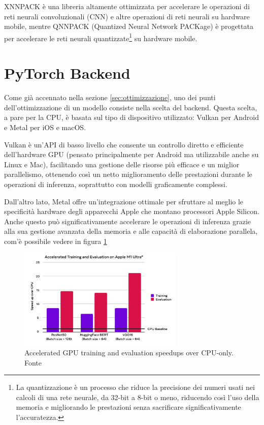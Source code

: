 XNNPACK\cite{XNNPACK} è una libreria altamente ottimizzata per accelerare le operazioni di reti neurali convoluzionali (CNN) e altre operazioni di reti neurali su hardware mobile,
mentre QNNPACK\cite{QNNPACK} (Quantized Neural Network PACKage) è progettata per accelerare le reti neurali quantizzate\footnote{La quantizzazione è un processo che riduce la precisione dei numeri usati nei calcoli di una rete neurale, da 32-bit a 8-bit o meno, riducendo così l'uso della memoria e migliorando le prestazioni senza sacrificare significativamente l'accuratezza.}
su hardware mobile.



\section{PyTorch Backend}
Come già accennato nella sezione \ref{sec:ottimizzazione}, uno dei punti dell'ottimizzazione di un modello consiste nella scelta del backend. Questa scelta,
a pare per la CPU, è basata sul tipo di dispositivo utilizzato: Vulkan per Android e Metal per iOS e macOS.

Vulkan\cite{Vulkan} è un'API di basso livello che consente un controllo diretto e efficiente dell'hardware GPU (pensato principalmente per Android ma
utilizzabile anche su Linux e Mac), facilitando una gestione delle risorse più efficace e un miglior parallelismo, ottenendo così un netto miglioramento
delle prestazioni durante le operazioni di inferenza, soprattutto con modelli graficamente complessi.

Dall'altro lato, Metal\cite{Metal} offre un'integrazione ottimale per sfruttare al meglio le specificità hardware degli apparecchi Apple che montano
processori Apple Silicon. Anche questo può significativamente accelerare le operazioni di inferenza grazie alla sua gestione avanzata della memoria e
alle capacità di elaborazione parallela, com'è possibile vedere in figura \ref{fig:metal}

\begin{figure}
    \centering
    \includegraphics[width=0.7\textwidth]{Immagini/metal.png}
    \caption{Accelerated GPU training and evaluation speedups over CPU-only. Fonte \cite{Metal}}
    \label{fig:metal}
\end{figure}

